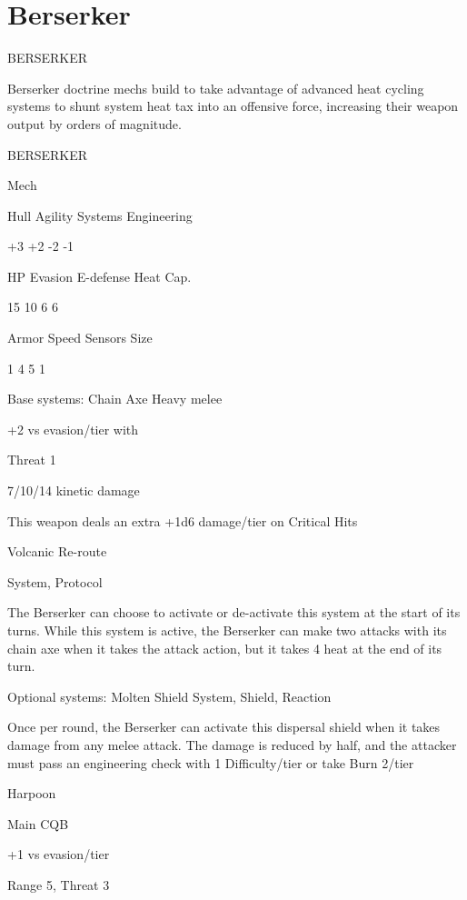 \section{Berserker}
                                            BERSERKER

Berserker doctrine mechs build to take advantage of advanced heat cycling systems to shunt
system heat tax into an offensive force, increasing their weapon output by orders of magnitude.

       BERSERKER

       Mech

       Hull      Agility      Systems       Engineering

       +3         +2          -2            -1

       HP         Evasion     E-defense     Heat Cap.

       15         10          6             6

       Armor     Speed        Sensors       Size

       1          4           5             1

Base systems:
Chain Axe
Heavy melee

+2 vs evasion/tier with

Threat 1

7/10/14 kinetic damage

This weapon deals an extra +1d6 damage/tier on Critical Hits


Volcanic Re-route

System, Protocol

The Berserker can choose to activate or de-activate this system at the start of its turns. While
this system is active, the Berserker can make two attacks with its chain axe when it takes the
attack action, but it takes 4 heat at the end of its turn.


Optional systems:
Molten Shield
System, Shield, Reaction

Once per round, the Berserker can activate this dispersal shield when it takes damage from any
melee attack. The damage is reduced by half, and the attacker must pass an engineering check
with 1 Difficulty/tier or take Burn 2/tier


Harpoon

Main CQB

+1 vs evasion/tier





Range 5, Threat 3


